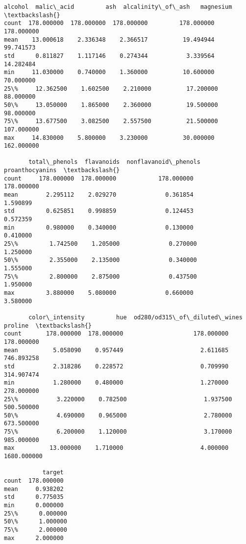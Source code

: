\documentclass[11pt]{article}
\makeatletter
\newcommand{\boxspacing}{\kern\kvtcb@left@rule\kern\kvtcb@boxsep}
\newcommand{\prompt}[4]{
        {\ttfamily\llap{{\color{#2}[#3]:\hspace{3pt}#4}}\vspace{-\baselineskip}}
    }
\makeatother
\begin{document}
            \begin{tcolorbox}[breakable, size=fbox, boxrule=.5pt, pad at break*=1mm, opacityfill=0]
\prompt{Out}{outcolor}{37}{\boxspacing}
\begin{Verbatim}[commandchars=\\\{\}]
          alcohol  malic\_acid         ash  alcalinity\_of\_ash   magnesium  \textbackslash{}
count  178.000000  178.000000  178.000000         178.000000  178.000000
mean    13.000618    2.336348    2.366517          19.494944   99.741573
std      0.811827    1.117146    0.274344           3.339564   14.282484
min     11.030000    0.740000    1.360000          10.600000   70.000000
25\%     12.362500    1.602500    2.210000          17.200000   88.000000
50\%     13.050000    1.865000    2.360000          19.500000   98.000000
75\%     13.677500    3.082500    2.557500          21.500000  107.000000
max     14.830000    5.800000    3.230000          30.000000  162.000000

       total\_phenols  flavanoids  nonflavanoid\_phenols  proanthocyanins  \textbackslash{}
count     178.000000  178.000000            178.000000       178.000000
mean        2.295112    2.029270              0.361854         1.590899
std         0.625851    0.998859              0.124453         0.572359
min         0.980000    0.340000              0.130000         0.410000
25\%         1.742500    1.205000              0.270000         1.250000
50\%         2.355000    2.135000              0.340000         1.555000
75\%         2.800000    2.875000              0.437500         1.950000
max         3.880000    5.080000              0.660000         3.580000

       color\_intensity         hue  od280/od315\_of\_diluted\_wines      proline  \textbackslash{}
count       178.000000  178.000000                    178.000000   178.000000
mean          5.058090    0.957449                      2.611685   746.893258
std           2.318286    0.228572                      0.709990   314.907474
min           1.280000    0.480000                      1.270000   278.000000
25\%           3.220000    0.782500                      1.937500   500.500000
50\%           4.690000    0.965000                      2.780000   673.500000
75\%           6.200000    1.120000                      3.170000   985.000000
max          13.000000    1.710000                      4.000000  1680.000000

           target
count  178.000000
mean     0.938202
std      0.775035
min      0.000000
25\%      0.000000
50\%      1.000000
75\%      2.000000
max      2.000000
\end{Verbatim}
\end{tcolorbox}
        
\end{document}
